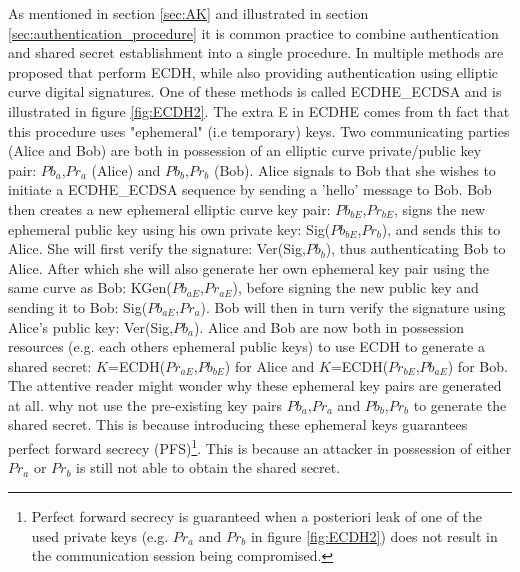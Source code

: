 As mentioned in section \ref{sec:AK} and illustrated in section \ref{sec:authentication_procedure} it is common practice to combine authentication and shared secret establishment into a single procedure. In \cite{RFC4492} multiple methods are proposed that perform ECDH, while also providing authentication using elliptic curve digital signatures. One of these methods is called ECDHE\_ECDSA and is illustrated in figure \ref{fig:ECDH2}. The extra E in ECDHE comes from th fact that this procedure uses "ephemeral" (i.e temporary) keys. Two communicating parties (Alice and Bob) are both in possession of an elliptic curve private/public key pair: $Pb_a$,$Pr_a$ (Alice) and $Pb_b$,$Pr_b$ (Bob). Alice signals to Bob that she wishes to initiate a ECDHE\_ECDSA sequence by sending a 'hello' message to Bob. Bob then creates a new ephemeral elliptic curve key pair: $Pb_{bE}$,$Pr_{bE}$, signs the new ephemeral public key using his own private key: Sig($Pb_{bE}$,$Pr_b$), and sends this to Alice. She will first verify the signature: Ver(Sig,$Pb_{b}$), thus authenticating Bob to Alice. After which she will also generate her own ephemeral key pair using the same curve as Bob: KGen($Pb_{aE}$,$Pr_{aE}$), before signing the new public key and sending it to Bob: Sig($Pb_{aE}$,$Pr_a$). Bob will then in turn verify the signature using Alice's public key: Ver(Sig,$Pb_{a}$). Alice and Bob are now both in possession resources (e.g. each others ephemeral public keys) to use ECDH to generate a shared secret: $K$=ECDH($Pr_{aE}$,$Pb_{bE}$) for Alice and $K$=ECDH($Pr_{bE}$,$Pb_{aE}$) for Bob. The attentive reader might wonder why these ephemeral key pairs are generated at all. why not use the pre-existing key pairs $Pb_a$,$Pr_a$ and $Pb_b$,$Pr_b$ to generate the shared secret. This is because introducing these ephemeral keys guarantees perfect forward secrecy (PFS)\footnote{Perfect forward secrecy is guaranteed when a posteriori leak of one of the used private keys (e.g. $Pr_a$ and $Pr_b$ in figure \ref{fig:ECDH2}) does not result in the communication session being compromised.}. This is because an attacker in possession of either $Pr_a$ or $Pr_b$ is still not able to obtain the shared secret.


